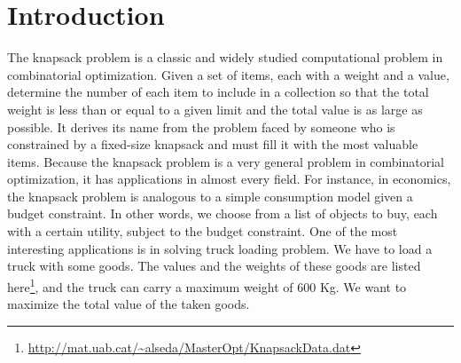 \section{Introduction}

The knapsack problem is a classic and widely studied computational problem in combinatorial optimization. Given a set of items, each with a weight and a value, determine the number of each item to include in a collection so that the total weight is less than or equal to a given limit and the total value is as large as possible. It derives its name from the problem faced by someone who is constrained by a fixed-size knapsack and must fill it with the most valuable items. Because the knapsack problem is a very general problem in combinatorial optimization, it has applications in almost every field. For instance, in economics, the knapsack problem
is analogous to a simple consumption model given a budget constraint. In other words, we choose from a
list of objects to buy, each with a certain utility, subject to the budget constraint. One of the most interesting applications is in solving truck loading problem. We have to load a truck with some goods. The values and the weights of these goods are listed here\footnote{\url{http://mat.uab.cat/~alseda/MasterOpt/KnapsackData.dat}}, and the truck can carry a maximum weight of 600 Kg. We want to maximize the total value of the taken goods.

